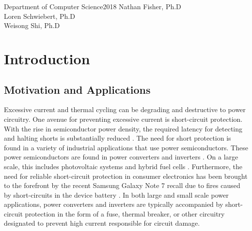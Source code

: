 \documentclass[11pt,compsoc,oneside]{report}
\begin{document}
{Department of Computer Science}{2018}
{Nathan Fisher, Ph.D\\
 Loren Schwiebert, Ph.D\\
 Weisong Shi, Ph.D
}
\setcounter{page}{1}

\tableofcontents     	%
\listoffigures       	%
\listoftables			%

\startthechapters
{}
\setcounter{page}{1}	%

\chapter{Introduction}		\label{chap:Introduction}

\section{Motivation and Applications}
Excessive current and thermal cycling can be degrading and destructive to power circuitry.
One avenue for preventing excessive current is short-circuit protection. 
With the rise in semiconductor power density, the required latency for detecting and halting shorts is substantially reduced \cite{gateChargeChara}.
The need for short protection is found in a variety of industrial applications that use power semiconductors. 
These power semiconductors are found in power converters and inverters \cite{hiSpeedProtection}.
On a large scale, this includes photovoltaic systems and hybrid fuel cells \cite{photoVoltaic}.
Furthermore, the need for reliable short-circuit protection in consumer electronics has been brought to the forefront by the recent Samsung Galaxy Note 7 recall due to fires caused by short-circuits in the device battery \cite{explodingPhone}.
In both large and small scale power applications, power converters and inverters are typically accompanied by short-circuit protection in the form of a fuse, thermal breaker, or other circuitry designated to prevent high current responsible for circuit damage.
\end{document}
